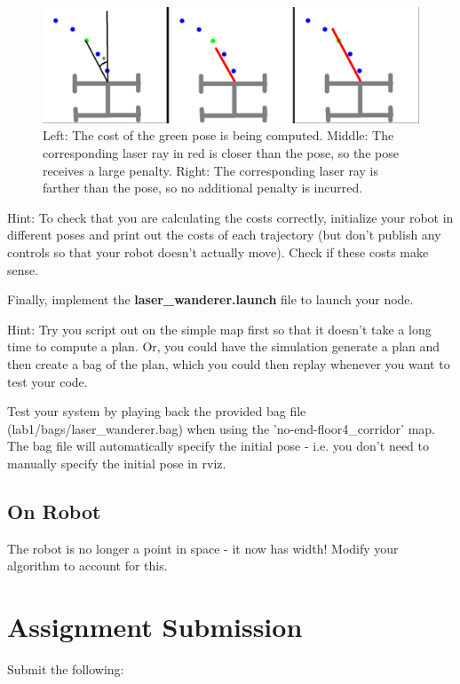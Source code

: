 \documentclass[final]{article}
\begin{document}
\begin{figure}[h]
\centering
\includegraphics[width=\linewidth]{figs/scan_cost.png}
\caption{Left: The cost of the green pose is being computed. Middle: The corresponding laser ray in red is closer than the pose, so the pose receives a large penalty. Right: The corresponding laser ray is farther than the pose, so no additional penalty is incurred. }
\label{fig:scan_cost}
\end{figure}


Hint: To check that you are calculating the costs correctly, initialize your robot in different poses and print out the costs of each trajectory (but don't publish any controls so that your robot doesn't actually move). Check if these costs make sense.

Finally, implement the \textbf{laser\_wanderer.launch} file to launch your node.

Hint: Try you script out on the simple map first so that it doesn't take a long time to compute a plan. Or, you could have the simulation generate a plan and then create a bag of the plan, which you could then replay whenever you want to test your code.

Test your system by playing back the provided bag file (lab1/bags/laser\_wanderer.bag) when using the 'no-end-floor4\_corridor' map. The bag file will automatically specify the initial pose - i.e. you don't need to manually specify the initial pose in rviz. 

\subsection{On Robot}

The robot is no longer a point in space - it now has width! Modify your algorithm to account for this. 

\section{Assignment Submission}

Submit the following:
\end{document}
